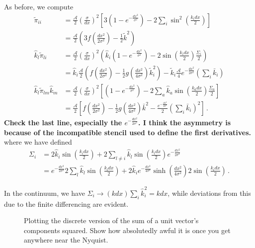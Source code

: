 \documentclass{revtex4}
\newcommand{\aSym}{\ensuremath{\mathcal{A}}}
\begin{document}
As before, we compute
\begin{subequations}
  \begin{align}
    \tilde{\pi}_{ii} &= \frac{\aSym}{2}\left(\frac{\sigma}{dx}\right)^2 \left[3\left(1-e^{-\frac{dx^2}{\sigma^2}}\right) - 2\sum_i\sin^2\left(\frac{k_idx}{2}\right)\right] \\
     &= \frac{\mathcal{A}}{2}\left(3f\left(\frac{dx^2}{2\sigma^2}\right) - \frac{1}{2}\tilde{k}^2\right) \\
    \hat{k}_l\tilde{\pi}_{li} &= \frac{\mathcal{A}}{2}\left(\frac{\sigma}{dx}\right)^2\left(\hat{k}_i\left(1-e^{-\frac{dx^2}{\sigma^2}}\right) - 2\sin\left(\frac{k_idx}{2}\right)\frac{\Sigma_i}{2}\right) \\
    &= \hat{k}_i\frac{\aSym}{2}\left(f\left(\frac{dx^2}{2\sigma^2}\right)-\frac{1}{2}g\left(\frac{dx^2}{4\sigma^2}\right)\tilde{k}_i^2\right) - \tilde{k}_i\frac{\aSym}{4}e^{-\frac{dx^2}{2\sigma^2}}\left(\sum_i\bar{k}_i\right)\\
    \hat{k}_l\tilde{\pi}_{lm}\hat{k}_m &= \frac{\mathcal{A}}{2}\left(\frac{\sigma}{dx}\right)^2\left[\left(1-e^{-\frac{dx^2}{\sigma^2}}\right) - 2\sum_a\hat{k}_a\sin\left(\frac{k_adx}{2}\right)\frac{\Sigma_a}{2} \right] \\
    &= \frac{\mathcal{A}}{2}\left[f\left(\frac{dx^2}{2\sigma^2}\right) -\frac{1}{2}g\left(\frac{dx^2}{4\sigma^2}\right)\bar{k}^2 - \frac{e^{-\frac{dx^2}{2\sigma^2}}}{2}\left(\sum_i\bar{k}_i\right)^2 \right]\, .
  \end{align}
\end{subequations}
    {\bf Check the last line, especially the $e^{-\frac{dx^2}{2\sigma^2}}$.  I think the asymmetry is because of the incompatible stencil used to define the first derivatives.}
where we have defined
\begin{align}
  \Sigma_i &= 2\hat{k}_i\sin\left(\frac{k_idx}{2}\right) + 2\sum_{l\neq i}\hat{k}_l\sin\left(\frac{k_ldx}{2}\right)e^{-\frac{dx^2}{2\sigma^2}} \\
   &= e^{-\frac{dx^2}{2\sigma^2}}2\sum_l\hat{k}_l\sin\left(\frac{k_ldx}{2}\right) + 2\hat{k}_ie^{-\frac{dx^2}{4\sigma^2}}\sinh\left(\frac{dx^2}{4\sigma^2}\right)2\sin\left(\frac{k_idx}{2}\right) \, .
\end{align}

In the continuum, we have $\Sigma_i \to (k dx)\sum_i\hat{k}_i^2 = kdx$, while deviations from this due to the finite differencing are evident.
\begin{figure}
  \caption{Plotting the discrete version of the sum of a unit vector's components squared.  Show how absolutedly awful it is once you get anywhere near the Nyquist.}
\end{figure}
\end{document}

